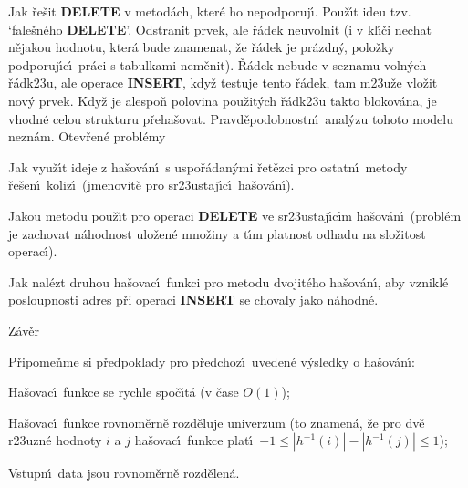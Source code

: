 \documentclass[a4paper,12pt]{article}
\begin{document}
\flushpar Jak \v re\v sit {\bf DELETE} v metod\'ach, kter\'e ho 
nepodporuj\'\i .\newline 
Pou\v z\'\i t ideu tzv. `fale\v sn\'eho {\bf DELETE}'. 
Odstranit prvek, ale \v r\'adek neuvolnit (i v kl\'\i\v ci nechat 
n\v ejakou hodnotu, kter\'a bude znamenat, \v ze \v r\'adek je 
pr\'azdn\'y, polo\v zky podporuj\'\i c\'\i\ pr\'aci s tabulkami nem\v enit). 
\v R\'adek nebude v seznamu voln\'ych \v r\'adk\accent23u, ale 
operace {\bf INSERT}, kdy\v z testuje tento \v r\'adek, tam 
m\accent23u\v ze vlo\v zit nov\'y prvek. Kdy\v z je alespo\v n 
polovina pou\v zit\'ych \v r\'adk\accent23u takto blokov\'ana, je 
vhodn\'e celou strukturu p\v reha\v sovat. Prav\-d\v epodobnostn\'\i\ 
anal\'yzu tohoto modelu nezn\'am.
\medskip
\subhead
Otev\v ren\'e probl\'emy
\endsubhead
\smallskip

\flushpar Jak vyu\v z\'\i t ideje z ha\v sov\'an\'\i\ s uspo\v r\'adan\'ymi 
\v ret\v ezci pro ostatn\'\i\ metody \v re\v sen\'\i\ koliz\'\i\ 
(jmeno\-vit\v e pro sr\accent23ustaj\'\i c\'\i\ ha\v sov\'an\'\i ).
\medskip

\flushpar Jakou metodu pou\v z\'\i t pro operaci {\bf DELETE} ve 
sr\accent23ustaj\'\i c\'\i m ha\v sov\'an\'\i\ (probl\'em je zachovat n\'ahodnost 
ulo\v zen\'e mno\v ziny a t\'\i m platnost odhadu na slo\v zitost operac\'\i ). 
\medskip

\flushpar Jak nal\'ezt druhou ha\v sovac\'\i\ funkci pro metodu 
dvojit\'eho ha\v so\-v\'a\-n\'\i , aby vznikl\'e posloupnosti adres p\v ri operaci 
{\bf INSERT} se chovaly jako n\'ahodn\'e.
\medskip

\subhead
Z\'av\v er
\endsubhead
\smallskip

\flushpar P\v ripome\v nme si p\v redpoklady pro p\v redchoz\'\i\ uveden\'e 
v\'ysledky o ha\v sov\'an\'\i :
\roster
\item
Ha\v sovac\'\i\ funkce se rychle spo\v c\'\i t\'a (v \v case 
$O(1)$);
\item Ha\v sovac\'\i\ funkce rovnom\v ern\v e rozd\v eluje univerzum (to 
znamen\'a, \v ze pro dv\v e r\accent23uzn\'e hodnoty $i$ a $j$ 
ha\v sovac\'\i\ funkce plat\'\i\ $-1\le |h^{-1}(i)|-|h^{-1}(j)|\le 
1$); 
\item
Vstupn\'\i\ data jsou rovnom\v ern\v e rozd\v elen\'a.
\endroster
\end{document}
